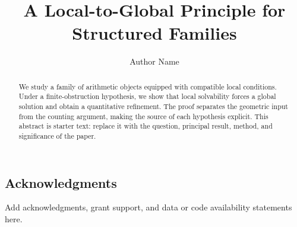 \documentclass[11pt,letterpaper]{article}
\title{A Local-to-Global Principle for Structured Families}
\author{Author Name}
\date{}
\numberwithin{equation}{section}
\theoremstyle{plain}
\theoremstyle{definition}
\theoremstyle{remark}
\begin{document}
\maketitle

\begin{abstract}
We study a family of arithmetic objects equipped with compatible local
conditions. Under a finite-obstruction hypothesis, we show that local
solvability forces a global solution and obtain a quantitative refinement.
The proof separates the geometric input from the counting argument, making
the source of each hypothesis explicit. This abstract is starter text: replace
it with the question, principal result, method, and significance of the paper.
\end{abstract}






\subsection*{Acknowledgments}
Add acknowledgments, grant support, and data or code availability statements
here.



\end{document}
